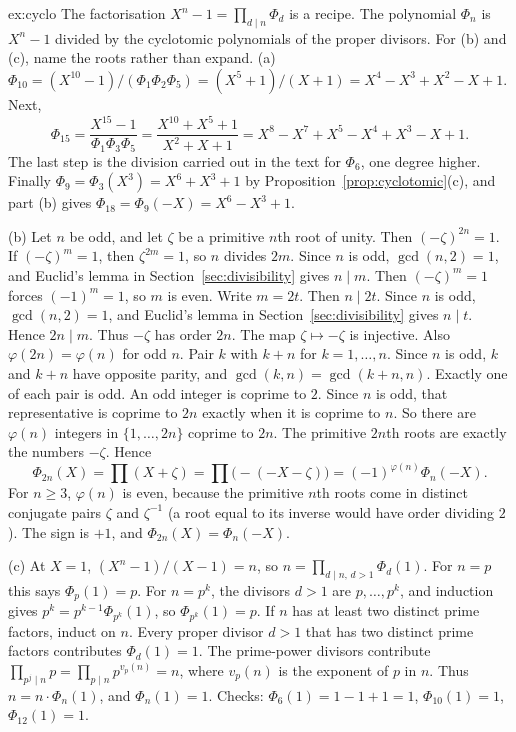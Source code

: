 \begin{solution}{ex:cyclo}
\idea The factorisation $X^n-1=\prod_{d\mid n}\Phi_d$ is a recipe. The polynomial $\Phi_n$ is $X^n-1$ divided by the cyclotomic polynomials of the proper divisors. For (b) and (c), name the roots rather than expand.
\writeup (a) $\Phi_{10}=(X^{10}-1)/(\Phi_1\Phi_2\Phi_5)=(X^5+1)/(X+1)=X^4-X^3+X^2-X+1$. Next,
\[
\Phi_{15}=\frac{X^{15}-1}{\Phi_1\Phi_3\Phi_5}=\frac{X^{10}+X^5+1}{X^2+X+1}=X^8-X^7+X^5-X^4+X^3-X+1.
\]
The last step is the division carried out in the text for $\Phi_6$, one degree higher. Finally $\Phi_9=\Phi_3(X^3)=X^6+X^3+1$ by Proposition~\ref{prop:cyclotomic}(c), and part (b) gives $\Phi_{18}=\Phi_9(-X)=X^6-X^3+1$.

(b) Let $n$ be odd, and let $\zeta$ be a primitive $n$th root of unity. Then $(-\zeta)^{2n}=1$. If $(-\zeta)^m=1$, then $\zeta^{2m}=1$, so $n$ divides $2m$. Since $n$ is odd, $\gcd(n,2)=1$, and Euclid's lemma in Section~\ref{sec:divisibility} gives $n\mid m$. Then $(-\zeta)^m=1$ forces $(-1)^m=1$, so $m$ is even. Write $m=2t$. Then $n\mid 2t$. Since $n$ is odd, $\gcd(n,2)=1$, and Euclid's lemma in Section~\ref{sec:divisibility} gives $n\mid t$. Hence $2n\mid m$. Thus $-\zeta$ has order $2n$. The map $\zeta\mapsto-\zeta$ is injective. Also $\varphi(2n)=\varphi(n)$ for odd $n$. Pair $k$ with $k+n$ for $k=1,\dots,n$. Since $n$ is odd, $k$ and $k+n$ have opposite parity, and $\gcd(k,n)=\gcd(k+n,n)$. Exactly one of each pair is odd. An odd integer is coprime to $2$. Since $n$ is odd, that representative is coprime to $2n$ exactly when it is coprime to $n$. So there are $\varphi(n)$ integers in $\{1,\dots,2n\}$ coprime to $2n$. The primitive $2n$th roots are exactly the numbers $-\zeta$. Hence
\[
\Phi_{2n}(X)=\prod(X+\zeta)=\prod\bigl(-(-X-\zeta)\bigr)=(-1)^{\varphi(n)}\Phi_n(-X).
\]
For $n\ge3$, $\varphi(n)$ is even, because the primitive $n$th roots come in distinct conjugate pairs $\zeta$ and $\zeta^{-1}$ (a root equal to its inverse would have order dividing $2$). The sign is $+1$, and $\Phi_{2n}(X)=\Phi_n(-X)$.

(c) At $X=1$, $(X^n-1)/(X-1)=n$, so $n=\prod_{d\mid n,\,d>1}\Phi_d(1)$. For $n=p$ this says $\Phi_p(1)=p$. For $n=p^k$, the divisors $d>1$ are $p,\dots,p^k$, and induction gives $p^k=p^{k-1}\Phi_{p^k}(1)$, so $\Phi_{p^k}(1)=p$. If $n$ has at least two distinct prime factors, induct on $n$. Every proper divisor $d>1$ that has two distinct prime factors contributes $\Phi_d(1)=1$. The prime-power divisors contribute $\prod_{p^j\mid n}p=\prod_{p\mid n}p^{v_p(n)}=n$, where $v_p(n)$ is the exponent of $p$ in $n$. Thus $n=n\cdot\Phi_n(1)$, and $\Phi_n(1)=1$. Checks: $\Phi_6(1)=1-1+1=1$, $\Phi_{10}(1)=1$, $\Phi_{12}(1)=1$.
\end{solution}

